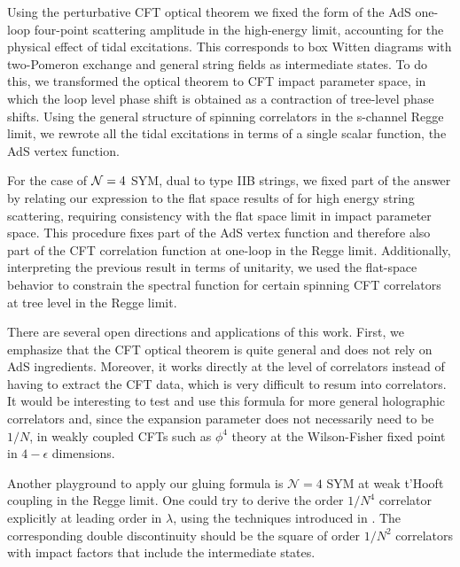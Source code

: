 Using the perturbative CFT optical theorem we fixed the form of the AdS one-loop four-point scattering amplitude in the high-energy limit, accounting for the physical effect of tidal excitations.  This corresponds to box Witten diagrams with two-Pomeron exchange and general string fields as intermediate states. To do this, we transformed the optical theorem to CFT impact parameter space, in which the loop level phase shift is obtained as a contraction of tree-level phase shifts.
Using the general structure of spinning correlators in the s-channel Regge limit, we rewrote all the tidal excitations in terms of a single scalar function, the AdS vertex function.

For the case of ${\cal N}=4$ SYM, dual to type IIB strings, we fixed part of the answer by relating our expression to the flat space results of \cite{Amati:1987wq,Amati:1987uf,Amati:1988tn} for high energy string scattering, requiring consistency with the flat space limit in impact parameter space. This procedure fixes part of the AdS vertex function and therefore also part of the CFT correlation function at one-loop in the Regge limit.
Additionally, interpreting the previous result in terms of unitarity, we used the flat-space behavior  to constrain the spectral function for certain spinning CFT correlators  at tree level in the Regge limit.


There are several open directions and applications of this work.
First, we emphasize that the CFT optical theorem is quite general and does not rely on AdS ingredients.
Moreover,   it works directly at the level of correlators instead of having to extract the CFT data, which is very difficult to resum into correlators. It would be interesting to test and use this formula for more general holographic correlators and, since the expansion parameter does not necessarily need to be $1/N$, in weakly coupled CFTs such as $\phi^4$ theory at the Wilson-Fisher fixed point in $4-\epsilon$ dimensions.

Another playground to apply our gluing formula  is $\mathcal{N}=4$ SYM at weak t'Hooft coupling in the Regge limit. One could try to derive the order $1/N^4$ correlator
explicitly  at leading order in $\lambda$, using the techniques introduced in \cite{Cornalba:2008qf}. The corresponding double discontinuity should be the square
of order  $1/N^2$ correlators with impact factors that include the intermediate states.

